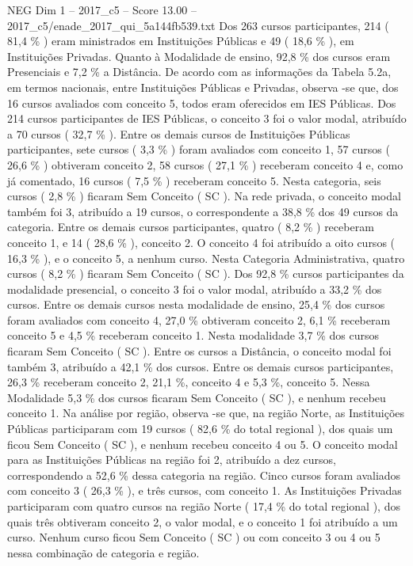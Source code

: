 \begin{textsample}{NEG Dim 1 – 2017\_c5 – Score 13.00 – 2017\_c5/enade\_2017\_qui\_5a144fb539.txt}
Dos 263 cursos participantes, 214 ( 81,4 \% ) eram ministrados em Instituições Públicas e 49 ( 18,6 \% ), em Instituições Privadas.
Quanto à Modalidade de ensino, 92,8 \% dos cursos eram Presenciais e 7,2 \% a Distância.
De acordo com as informações da Tabela 5.2a, em termos nacionais, entre Instituições Públicas e Privadas, observa -se que, dos 16 cursos avaliados com conceito 5, todos eram oferecidos em IES Públicas.
Dos 214 cursos participantes de IES Públicas, o conceito 3 foi o valor modal, atribuído a 70 cursos ( 32,7 \% ).
Entre os demais cursos de Instituições Públicas participantes, sete cursos ( 3,3 \% ) foram avaliados com conceito 1, 57 cursos ( 26,6 \% ) obtiveram conceito 2, 58 cursos ( 27,1 \% ) receberam conceito 4 e, como já comentado, 16 cursos ( 7,5 \% ) receberam conceito 5.
Nesta categoria, seis cursos ( 2,8 \% ) ficaram Sem Conceito ( SC ).
Na rede privada, o conceito modal também foi 3, atribuído a 19 cursos, o correspondente a 38,8 \% dos 49 cursos da categoria.
Entre os demais cursos participantes, quatro ( 8,2 \% ) receberam conceito 1, e 14 ( 28,6 \% ), conceito 2.
O conceito 4 foi atribuído a oito cursos ( 16,3 \% ), e o conceito 5, a nenhum curso.
Nesta Categoria Administrativa, quatro cursos ( 8,2 \% ) ficaram Sem Conceito ( SC ).
Dos 92,8 \% cursos participantes da modalidade presencial, o conceito 3 foi o valor modal, atribuído a 33,2 \% dos cursos.
Entre os demais cursos nesta modalidade de ensino, 25,4 \% dos cursos foram avaliados com conceito 4, 27,0 \% obtiveram conceito 2, 6,1 \% receberam conceito 5 e 4,5 \% receberam conceito 1.
Nesta modalidade 3,7 \% dos cursos ficaram Sem Conceito ( SC ).
Entre os cursos a Distância, o conceito modal foi também 3, atribuído a 42,1 \% dos cursos.
Entre os demais cursos participantes, 26,3 \% receberam conceito 2, 21,1 \%, conceito 4 e 5,3 \%, conceito 5.
Nessa Modalidade 5,3 \% dos cursos ficaram Sem Conceito ( SC ), e nenhum recebeu conceito 1.
Na análise por região, observa -se que, na região Norte, as Instituições Públicas participaram com 19 cursos ( 82,6 \% do total regional ), dos quais um ficou Sem Conceito ( SC ), e nenhum recebeu conceito 4 ou 5.
O conceito modal para as Instituições Públicas na região foi 2, atribuído a dez cursos, correspondendo a 52,6 \% dessa categoria na região.
Cinco cursos foram avaliados com conceito 3 ( 26,3 \% ), e três cursos, com conceito 1.
As Instituições Privadas participaram com quatro cursos na região Norte ( 17,4 \% do total regional ), dos quais três obtiveram conceito 2, o valor modal, e o conceito 1 foi atribuído a um curso.
Nenhum curso ficou Sem Conceito ( SC ) ou com conceito 3 ou 4 ou 5 nessa combinação de categoria e região.

\end{textsample}
